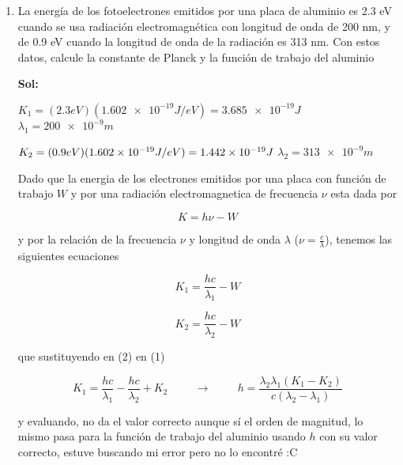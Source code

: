 \documentclass[12pt,a4paper]{article}
\begin{document}
\begin{enumerate}
    
    \item La energía de los fotoelectrones emitidos por una placa de aluminio es 2.3 eV cuando se usa radiación electromagnética con longitud de onda de 200 nm, y de 0.9 eV cuando la longitud de onda de la radiación es 313 nm. Con estos datos, calcule la constante de Planck y la función de trabajo del aluminio
    
    \textbf{Sol:}
    
    $K_1 = (2.3 eV)(\num{1.602 e-19} J/eV)= \num{3.685 e-19 }J $ \hspace{1cm}  $\lambda_1 = \num{200 e-9} m$
    
    $K_2 = (0.9 eV)(\num{1.602 e-19} J/eV) = \num{1.442 e -19}J$ \hspace{1cm} $\lambda_2 = \num{313 e-9} m $
    
    Dado que la energia de los electrones emitidos por una placa con función de trabajo $W$ y por una radiación electromagnetica de frecuencia $\nu$ esta dada por
    
    \begin{equation*}
        K = h\nu - W
    \end{equation*}
    
    y por la relación de la frecuencia $\nu$ y longitud de onda $\lambda$ ($\nu = \frac{c}{\lambda}$), tenemos las siguientes ecuaciones
    
    \begin{equation}
        K_1 = \frac{hc}{\lambda_1} - W
    \end{equation}
    
    \begin{equation}
        K_2 = \frac{hc}{\lambda_2} - W
    \end{equation}
    
    que sustituyendo en (2) en (1)
    
    \begin{equation*}
        K_1 =\frac{hc}{\lambda_1} - \frac{hc}{\lambda_2} + K_2 \hspace{1cm} \rightarrow  \hspace{1cm} h = \frac{\lambda_2 \lambda_1 (K_1 - K_2)}{c(\lambda_2 - \lambda_1)}
    \end{equation*}
    
    y evaluando, no da el valor correcto aunque sí el orden de magnitud, lo mismo pasa para la función de trabajo del aluminio usando $h$ con su valor correcto, estuve buscando mi error pero no lo encontré 
    :C
    
    
    

\end{enumerate}
\end{document}
